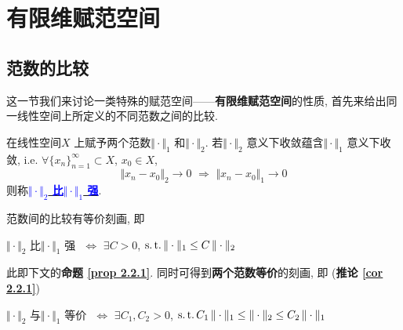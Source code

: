 \newpage

\section{有限维赋范空间}
\subsection{范数的比较}
	这一节我们来讨论一类特殊的赋范空间——\textbf{有限维赋范空间}的性质, 首先来给出同一线性空间上所定义的不同范数之间的比较. 
	
	\vspace{2em}
	
	\begin{defn}\label{def 2.2.1}
		在线性空间$X$ 上赋予两个范数$\Vert \cdot \Vert_1$ 和$\Vert \cdot \Vert_2$. 若$\Vert \cdot \Vert_2$ 意义下收敛蕴含$\Vert \cdot \Vert_1$ 意义下收敛, i.e. $\forall \{ x_n \}_{n = 1}^{\infty} \subset X$, $x_0 \in X$, 
		\[ \Vert x_n - x_0 \Vert_2 \to 0 \,\, \Rightarrow \,\, \Vert x_n - x_0 \Vert_1 \to 0 \]
		则称\underline{\textcolor{blue}{\textbf{$\Vert \cdot \Vert_2$ 比$\Vert \cdot \Vert_1$ 强}}}. 
		
		\vspace{4em}
		
		\begin{rmk}
			范数间的比较有等价刻画, 即
			\begin{center}
				$\Vert \cdot \Vert_2$ 比$\Vert \cdot \Vert_1$ 强 $\,\, \Leftrightarrow \,\, \exists C > 0$, $\operatorname{s.t.} \Vert \cdot \Vert_1 \leq C \, \Vert \cdot \Vert_2$
			\end{center}
			此即下文的\textbf{命题 \ref{prop 2.2.1}}. 同时可得到\textbf{两个范数等价}的刻画, 即 (\textbf{推论 \ref{cor 2.2.1}})
			\begin{center}
				$\Vert \cdot \Vert_2$ 与$\Vert \cdot \Vert_1$ 等价 $\,\, \Leftrightarrow \,\, \exists C_1 , C_2 > 0$, $\operatorname{s.t.} C_1 \, \Vert \cdot \Vert_1 \leq \Vert \cdot \Vert_2 \leq C_2 \, \Vert \cdot \Vert_1$
			\end{center}
		\end{rmk}
	\end{defn}
	
	\vspace{12em}
	
